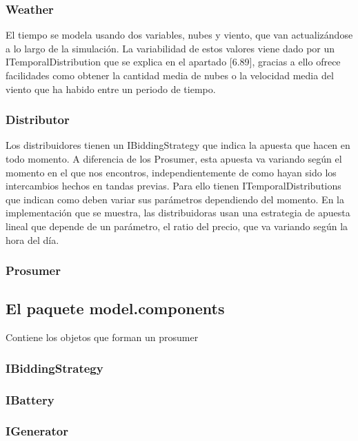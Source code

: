 \documentclass[12pt,a4paper,openright,oneside]{article}
\numberwithin{equation}{section}
\theoremstyle{definition}
\begin{document}
\subsubsection{Weather}

El tiempo se modela usando dos variables, nubes y viento, que van actualizándose a lo largo de la simulación. La variabilidad de estos valores viene dado por un ITemporalDistribution que se explica en el apartado [6.89], gracias a ello ofrece facilidades como obtener la cantidad media de nubes o la velocidad media del viento que ha habido entre un periodo de tiempo. 

\subsubsection{Distributor}

Los distribuidores tienen un IBiddingStrategy que indica la apuesta que hacen en todo momento. A diferencia de los Prosumer, esta apuesta va variando según el momento en el que nos encontros, independientemente de como hayan sido los intercambios hechos en tandas previas. Para ello tienen ITemporalDistributions que indican como deben variar sus parámetros dependiendo del momento. En la implementación que se muestra, las distribuidoras usan una estrategia de apuesta lineal que depende de un parámetro, el ratio del precio, que va variando según la hora del día. 

\subsubsection{Prosumer}

\subsection{El paquete model.components} 
Contiene los objetos que forman un prosumer
\subsubsection{IBiddingStrategy}

\subsubsection{IBattery}

\subsubsection{IGenerator}
\end{document}
